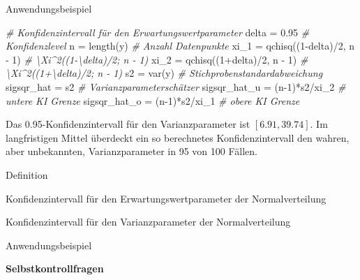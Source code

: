 \documentclass[
  8pt,
  ignorenonframetext,
]{beamer}
\newenvironment{Shaded}{\begin{snugshade}}{\end{snugshade}}
\newcommand{\CommentTok}[1]{\textcolor[rgb]{0.56,0.35,0.01}{\textit{#1}}}
\newcommand{\DecValTok}[1]{\textcolor[rgb]{0.00,0.00,0.81}{#1}}
\newcommand{\FloatTok}[1]{\textcolor[rgb]{0.00,0.00,0.81}{#1}}
\newcommand{\FunctionTok}[1]{\textcolor[rgb]{0.00,0.00,0.00}{#1}}
\newcommand{\NormalTok}[1]{#1}
\newcommand{\OtherTok}[1]{\textcolor[rgb]{0.56,0.35,0.01}{#1}}
\newcommand{\SpecialCharTok}[1]{\textcolor[rgb]{0.00,0.00,0.00}{#1}}
\begin{document}
\begin{frame}[fragile,t]{Anwendungsbeispiel}
\begin{Shaded}
\begin{Highlighting}[]
\CommentTok{\# Konfidenzintervall für den Erwartungswertparameter}
\NormalTok{delta         }\OtherTok{=} \FloatTok{0.95}                            \CommentTok{\# Konfidenzlevel}
\NormalTok{n            }\OtherTok{=} \FunctionTok{length}\NormalTok{(y)                        }\CommentTok{\# Anzahl Datenpunkte}
\NormalTok{xi\_1         }\OtherTok{=} \FunctionTok{qchisq}\NormalTok{((}\DecValTok{1}\SpecialCharTok{{-}}\NormalTok{delta)}\SpecialCharTok{/}\DecValTok{2}\NormalTok{, n }\SpecialCharTok{{-}} \DecValTok{1}\NormalTok{)       }\CommentTok{\# \textbackslash{}Xi\^{}2((1{-}\textbackslash{}delta)/2; n {-} 1)}
\NormalTok{xi\_2         }\OtherTok{=} \FunctionTok{qchisq}\NormalTok{((}\DecValTok{1}\SpecialCharTok{+}\NormalTok{delta)}\SpecialCharTok{/}\DecValTok{2}\NormalTok{, n }\SpecialCharTok{{-}} \DecValTok{1}\NormalTok{)       }\CommentTok{\# \textbackslash{}Xi\^{}2((1+\textbackslash{}delta)/2; n {-} 1)}
\NormalTok{s2           }\OtherTok{=} \FunctionTok{var}\NormalTok{(y)                           }\CommentTok{\# Stichprobenstandardabweichung}
\NormalTok{sigsqr\_hat   }\OtherTok{=}\NormalTok{ s2                               }\CommentTok{\# Varianzparameterschätzer}
\NormalTok{sigsqr\_hat\_u }\OtherTok{=}\NormalTok{ (n}\DecValTok{{-}1}\NormalTok{)}\SpecialCharTok{*}\NormalTok{s2}\SpecialCharTok{/}\NormalTok{xi\_2                    }\CommentTok{\# untere KI Grenze}
\NormalTok{sigsqr\_hat\_o }\OtherTok{=}\NormalTok{ (n}\DecValTok{{-}1}\NormalTok{)}\SpecialCharTok{*}\NormalTok{s2}\SpecialCharTok{/}\NormalTok{xi\_1                    }\CommentTok{\# obere KI Grenze}
\end{Highlighting}
\end{Shaded}

\footnotesize
{}

Das 0.95-Konfidenzintervall für den Varianzparameter ist
\([6.91, 39.74]\). Im langfristigen Mittel überdeckt ein so berechnetes
Konfidenzintervall den wahren, aber unbekannten, Varianzparameter in 95
von 100 Fällen.
\end{frame}

\begin{frame}{}
\protect\hypertarget{section-10}{}
\large

Definition

Konfidenzintervall für den Erwartungswertparameter der Normalverteilung

Konfidenzintervall für den Varianzparameter der Normalverteilung

Anwendungsbeispiel

\textbf{Selbstkontrollfragen}
\end{frame}
\end{document}
